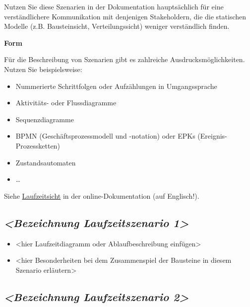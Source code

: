 \documentclass[
]{article}
\begin{document}
Nutzen Sie diese Szenarien in der Dokumentation hauptsächlich für eine
verständlichere Kommunikation mit denjenigen Stakeholdern, die die
statischen Modelle (z.B. Bausteinsicht, Verteilungssicht) weniger
verständlich finden.

\textbf{Form}

Für die Beschreibung von Szenarien gibt es zahlreiche
Ausdrucksmöglichkeiten. Nutzen Sie beispielsweise:

\begin{itemize}
\item
  Nummerierte Schrittfolgen oder Aufzählungen in Umgangssprache
\item
  Aktivitäts- oder Flussdiagramme
\item
  Sequenzdiagramme
\item
  BPMN (Geschäftsprozessmodell und -notation) oder EPKs
  (Ereignis-Prozessketten)
\item
  Zustandsautomaten
\item
  \ldots{}
\end{itemize}

Siehe \href{https://docs.arc42.org/section-6/}{Laufzeitsicht} in der
online-Dokumentation (auf Englisch!).

\hypertarget{__emphasis_bezeichnung_laufzeitszenario_1_emphasis}{%
\subsection{\texorpdfstring{\emph{\textless Bezeichnung Laufzeitszenario
1\textgreater{}}}{\textless Bezeichnung Laufzeitszenario 1\textgreater{}}}\label{__emphasis_bezeichnung_laufzeitszenario_1_emphasis}}

\begin{itemize}
\item
  \textless hier Laufzeitdiagramm oder Ablaufbeschreibung
  einfügen\textgreater{}
\item
  \textless hier Besonderheiten bei dem Zusammenspiel der Bausteine in
  diesem Szenario erläutern\textgreater{}
\end{itemize}

\hypertarget{__emphasis_bezeichnung_laufzeitszenario_2_emphasis}{%
\subsection{\texorpdfstring{\emph{\textless Bezeichnung Laufzeitszenario
2\textgreater{}}}{\textless Bezeichnung Laufzeitszenario 2\textgreater{}}}\label{__emphasis_bezeichnung_laufzeitszenario_2_emphasis}}
\end{document}
